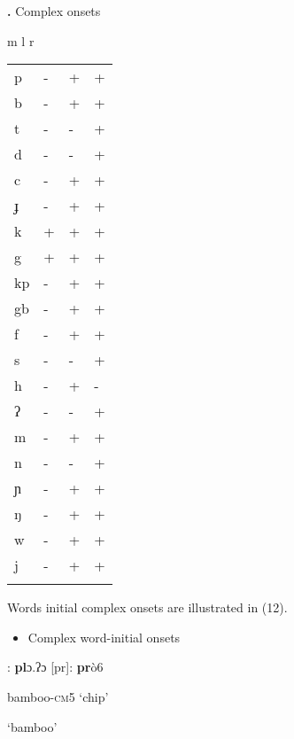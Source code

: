 \begin{styleindexi}
\textbf{.} Complex onsets 
\end{styleindexi}

  m    l         r

\begin{tabularx}{\textwidth}{XXXX}
\lsptoprule
p & {}- & + & +\\
b & {}- & + & +\\
t & {}- & {}- & +\\
d & {}- & {}- & +\\
c & {}- & + & +\\
ɟ & {}- & + & +\\
k & + & + & +\\
g & + & + & +\\
kp & {}- & + & +\\
gb & {}- & + & +\\
f & {}- & + & +\\
s & {}- & {}- & +\\
h & {}- & + & {}-\\
ʔ & {}- & {}- & +\\
m & {}- & + & +\\
n & {}- & {}- & +\\
ɲ & {}- & + & +\\
ŋ & {}- & + & +\\
w & {}- & + & +\\
j & {}- & + & +\\
\lspbottomrule
\end{tabularx}
Words initial complex onsets are illustrated in (12). 

\begin{itemize}
\item \begin{styleindexi}
  \label{bkm:Ref475817647}Complex word-initial onsets   
\end{styleindexi}\end{itemize}
\begin{styleindexi}
          [pl]:       \textbf{pl}ɔ.ʔɔ                                    [pr]:       \textbf{pr}ò6             
\end{styleindexi}

\begin{styleindexi}
                      bamboo-\textsc{cm}5                                      ‘chip’
\end{styleindexi}

\begin{styleindexi}
                      ‘bamboo’                                          
\end{styleindexi}

